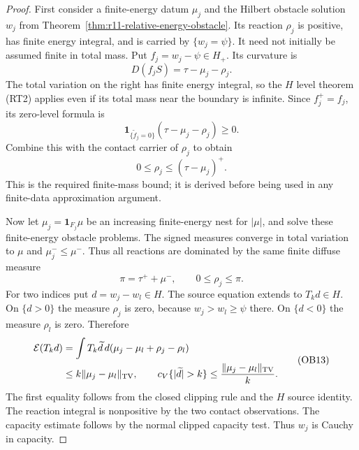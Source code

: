 \documentclass[11pt,a4paper]{article}
\numberwithin{equation}{section}
\theoremstyle{definition}
\theoremstyle{remark}
\begin{document}
\begin{proof}
First consider a finite-energy datum $\mu_j$ and the Hilbert obstacle
solution $w_j$ from Theorem~\ref{thm:r11-relative-energy-obstacle}.
Its reaction $\rho_j$ is positive, has finite energy integral, and is
carried by $\{w_j=\psi\}$.  It need not initially be assumed finite
in total mass.  Put $f_j=w_j-\psi\in H_+$.  Its curvature is
\[
                           D(f_jS)=\tau-\mu_j-\rho_j.
\]
The total variation on the right has finite energy integral, so the
$H$ level theorem (RT2) applies even if its total mass near the
boundary is infinite.  Since $f_j^+=f_j$, its zero-level formula is
\[
        \mathbf1_{\{\widetilde f_j=0\}}
                         (\tau-\mu_j-\rho_j)\ge0.
 \tag{OB10}
\]
Combine this with the contact carrier of $\rho_j$ to obtain
\[
                          0\le\rho_j\le(\tau-\mu_j)^+.
 \tag{OB11}
\]
This is the required finite-mass bound; it is derived before being
used in any finite-data approximation argument.

Now let $\mu_j=\mathbf1_{F_j}\mu$ be an increasing finite-energy
nest for $|\mu|$, and solve these finite-energy obstacle problems.
The signed measures converge in total variation to $\mu$ and
$\mu_j^-\le\mu^-$.  Thus all reactions are dominated by the same
finite diffuse measure
\[
                         \pi=\tau^++\mu^-,\qquad 0\le\rho_j\le\pi.
 \tag{OB12}
\]
For two indices put $d=w_j-w_l\in H$.  The source equation extends
to $T_kd\in H$.  On $\{d>0\}$ the measure $\rho_j$ is zero,
because $w_j>w_l\ge\psi$ there.  On $\{d<0\}$ the measure
$\rho_l$ is zero.  Therefore
\[
 \begin{split}
 \mathcal E(T_kd)
   &=\int T_k\widetilde d\,d(\mu_j-\mu_l+\rho_j-\rho_l)\\
   &\le k\|\mu_j-\mu_l\|_{\rm TV},\qquad
 c_V\{|\widetilde d|>k\}
                         \le\frac{\|\mu_j-\mu_l\|_{\rm TV}}{k}.
 \end{split}
 \tag{OB13}
\]
The first equality follows from the closed clipping rule and the
$H$ source identity.  The reaction integral is nonpositive by the
two contact observations.  The capacity estimate follows by the
normal clipped capacity test.  Thus $w_j$ is Cauchy in capacity.


\end{proof}
\end{document}

